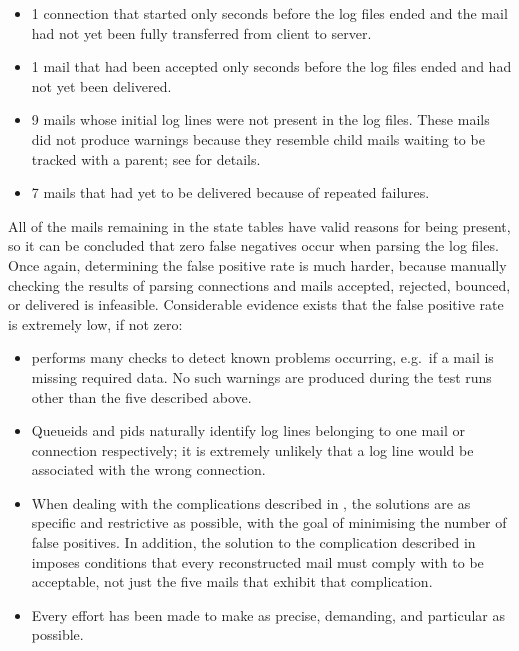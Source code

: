 \begin{itemize}

    \squeezeitems{}

    \item 1 connection that started only seconds before the log files ended
        and the mail had not yet been fully transferred from client to
        server.

    \item 1 mail that had been accepted only seconds before the log files
        ended and had not yet been delivered.

    \item 9 mails whose initial log lines were not present in the log
        files.  These mails did not produce warnings because they resemble
        child mails waiting to be tracked with a parent; see
         for details.

    \item 7 mails that had yet to be delivered because of repeated
        failures.

\end{itemize}

All of the mails remaining in the state tables have valid reasons for being
present, so it can be concluded that zero false negatives occur when
parsing the \numberOFlogFILES{} log files.  Once again, determining the
false positive rate is much harder, because manually checking the results
of parsing \numberOFconnectionsINlogFILES{} connections and mails accepted,
rejected, bounced, or delivered is infeasible.  Considerable evidence
exists that the false positive rate is extremely low, if not zero:

\begin{itemize}

    \item \parsername{} performs many checks to detect known problems
        occurring, e.g.\ if a mail is missing required data.  No such
        warnings are produced during the test runs other than the five
        described above.

    \item Queueids and \glspl{pid} naturally identify log lines belonging
        to one mail or connection respectively; it is extremely unlikely
        that a log line would be associated with the wrong connection.

    \item When dealing with the complications described in
        , the solutions are as specific and
        restrictive as possible, with the goal of minimising the number of
        false positives.  In addition, the solution to the complication
        described in  imposes conditions
        that every reconstructed mail must comply with to be acceptable,
        not just the five mails that exhibit that complication.

    \item Every effort has been made to make \parsername{} as precise,
        demanding, and particular as possible.

\end{itemize}

